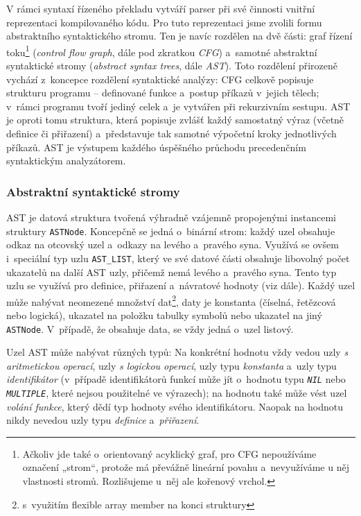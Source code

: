 \documentclass[11pt]{article}
\begin{document}
V rámci syntaxí řízeného překladu vytváří parser při své činnosti vnitřní reprezentaci kompilovaného kódu. Pro tuto reprezentaci jsme zvolili formu abstraktního syntaktického stromu. Ten je navíc rozdělen na dvě části: graf řízení toku\footnote{Ačkoliv jde také o~orientovaný acyklický graf, pro CFG nepoužíváme označení „strom“, protože má převážně lineární povahu a~nevyužíváme u něj vlastnosti stromů. Rozlišujeme u~něj ale kořenový vrchol.} (\emph{control flow graph}, dále pod zkratkou \emph{CFG}) a~samotné abstraktní syntaktické stromy (\emph{abstract syntax trees}, dále \emph{AST}). Toto rozdělení přirozeně vychází z~koncepce rozdělení syntaktické analýzy: CFG celkově popisuje strukturu programu -- definované funkce a~postup příkazů v~jejich tělech; v~rámci programu tvoří jediný celek a~je vytvářen při rekurzivním sestupu. AST je oproti tomu struktura, která popisuje zvlášť každý samostatný výraz (včetně definice či přiřazení) a~představuje tak samotné výpočetní kroky jednotlivých příkazů. AST je výstupem každého úspěšného průchodu precedenčním syntaktickým analyzátorem.

\subsubsection{Abstraktní syntaktické stromy}
\label{sec:ast}

AST je datová struktura tvořená výhradně vzájemně propojenými instancemi struktury \texttt{ASTNode}. Koncepčně se jedná o~binární strom: každý uzel obsahuje odkaz na otcovský uzel a~odkazy na levého a~pravého syna. Využívá se ovšem i~speciální typ uzlu \texttt{AST\_LIST}, který ve své datové části obsahuje libovolný počet ukazatelů na další AST uzly, přičemž nemá levého a~pravého syna. Tento typ uzlu se využívá pro definice, přiřazení a~návratové hodnoty (viz dále). Každý uzel může nabývat neomezené množství dat\footnote{s~využitím flexible array member na konci struktury}, daty je konstanta (číselná, řetězcová nebo logická), ukazatel na položku tabulky symbolů nebo ukazatel na jiný \texttt{ASTNode}. V~případě, že obsahuje data, se vždy jedná o~uzel listový.

Uzel AST může nabývat různých typů: Na konkrétní hodnotu vždy vedou uzly \emph{s aritmetickou operací}, uzly \emph{s logickou operací}, uzly typu \emph{konstanta} a~uzly typu \emph{identifikátor} (v~případě identifikátorů funkcí může jít o~hodnotu typu \texttt{\textit{NIL}} nebo \texttt{\textit{MULTIPLE}}, které nejsou použitelné ve výrazech); na hodnotu také může vést uzel \emph{volání funkce}, který dědí typ hodnoty svého identifikátoru. Naopak na hodnotu nikdy nevedou uzly typu \emph{definice} a~\emph{přiřazení}.
\end{document}
